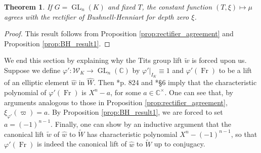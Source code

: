 \documentclass{compositio}
\theoremstyle{plain}
\newtheorem{theorem}{Theorem}[section]
\theoremstyle{definition}
\numberwithin{equation}{section}
\DeclareMathOperator{\Fr}{Fr}
\DeclareMathOperator{\GL}{GL}
\newcommand{\CC}{\mathbb{C}}
\newcommand{\CCx}{\mathbb{C}^\times}
\newcommand{\Weil}{\mathcal{W}}
\begin{document}
\begin{theorem} \label{thm:bh_agreement}
  If $G = \GL_{n}(K)$ and fixed $T$, the constant function $(T,\xi) \mapsto \mu$ agrees with
  the rectifier of Bushnell-Henniart for depth zero $\xi$.
\end{theorem}

\begin{proof}
This result follows from Proposition \ref{prop:rectifier_agreement} and Proposition \ref{prop:BH_result1}.
\end{proof}

We end this section by explaining why the Tits group lift $\tilde{w}$ is forced upon us.
Suppose we define
$\varphi' : \Weil_K \rightarrow \GL_{n}(\CC)$ by $\varphi'|_{I_K} \equiv 1$ and
$\varphi'(\Fr)$ to be a lift of an elliptic element $\hat{w}$ in $\hat{W}$.
Then \cite{reeder-debacker:09a}*{p. 824} and \cite{reeder:08a}*{\S6} imply that the characteristic
polynomial of $\varphi'(\Fr)$ is $X^n - a$, for some $a \in \CCx$.  One can see that,
by arguments analogous to those in Proposition \ref{prop:rectifier_agreement},
$\xi_{\varphi'}(\varpi) = a$.  By Proposition \ref{prop:BH_result1}, we are
forced to set $a = (-1)^{n-1}$.  Finally, one can show by an inductive argument that the
canonical lift $\tilde{w}$ of $\hat{w}$ to $\widetilde{W}$ has characteristic polynomial $X^n - (-1)^{n-1}$,
so that $\varphi'(\Fr)$ is indeed the canonical lift of $\hat{w}$ to $\widetilde{W}$ up to conjugacy.



\end{document}
